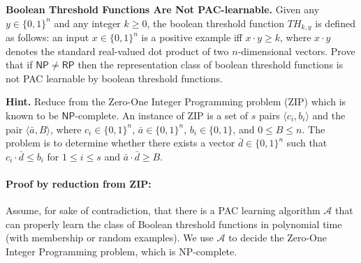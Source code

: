 \documentclass[11pt]{article}
\DeclareMathOperator{\1}{\mathbbm{1}}
\begin{document}
\begin{problem} [15 pts] \textbf{Boolean Threshold Functions Are Not PAC-learnable.} Given any $y \in \{0,1\}^n$ and any integer $k \geq 0$, the boolean threshold function $TH_{k,y}$ is defined as follows: an input $x \in \{0,1\}^n$ is a positive example iff $x \cdot y \geq k$, where $x \cdot y$ denotes the standard real-valued dot product of two $n$-dimensional vectors. Prove that if $\mathsf{NP} \neq \mathsf{RP}$ then the representation class of boolean threshold functions is not PAC learnable by boolean threshold functions.

\textbf{Hint.} Reduce from the Zero-One Integer Programming problem (ZIP) which is known to be $\mathsf{NP}$-complete. An instance of ZIP is a set of $s$ pairs $\langle c_i, b_i \rangle$ and the pair $\langle \bar{a}, B \rangle$, where $c_i \in \{0,1\}^n$, $\bar{a} \in \{0,1\}^n$, $b_i \in \{0,1\}$, and $0 \leq B \leq n$. The problem is to determine whether there exists a vector $\bar{d} \in \{0,1\}^n$ such that $c_i \cdot \bar{d} \leq b_i$ for $1 \leq i \leq s$ and $\bar{a} \cdot \bar{d} \geq B$.

\end{problem}

\paragraph{Proof by reduction from ZIP:} Assume, for sake of contradiction, that there is a PAC learning algorithm $\mathcal{A}$ that can properly learn the class of Boolean threshold functions in polynomial time (with membership or random examples). We use $\mathcal{A}$ to decide the Zero-One Integer Programming problem, which is NP-complete.
\end{document}
